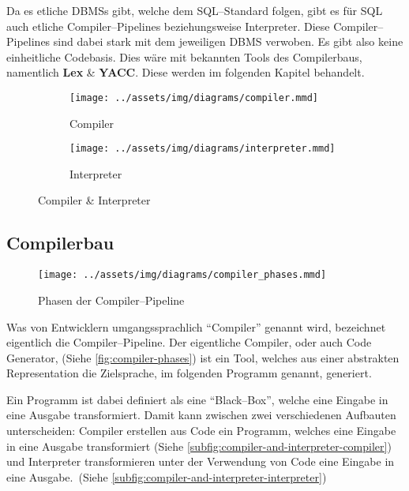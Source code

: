 Da es etliche \acp{DBMS} gibt, welche dem \ac{SQL}--Standard folgen, gibt es für \ac{SQL} auch etliche Compiler--Pipelines beziehungsweise Interpreter.
Diese Compiler--Pipelines sind dabei stark mit dem jeweiligen \ac{DBMS} verwoben.
Es gibt also keine einheitliche Codebasis.
Dies wäre mit bekannten Tools des Compilerbaus, namentlich \textbf{Lex} \& \textbf{YACC}.
Diese werden im folgenden Kapitel behandelt.

\begin{figure}[ht]
    \begin{subfigure}[c]{0.5\textwidth}
        \begin{center}
            \texttt{[image: ../assets/img/diagrams/compiler.mmd]}
        \end{center}
        \caption{Compiler}
        \label{subfig:compiler-and-interpreter-compiler}
    \end{subfigure}
    \begin{subfigure}[c]{0.5\textwidth}
        \begin{center}
            \texttt{[image: ../assets/img/diagrams/interpreter.mmd]}
        \end{center}
        \caption{Interpreter}
        \label{subfig:compiler-and-interpreter-interpreter}
    \end{subfigure}
    \caption{Compiler \& Interpreter~\autocite{aho-2006}}
    \label{fig:compiler-and-interpreter}
\end{figure}
\newpage

\subsection{Compilerbau}\label{subsec:compilerbau}
\begin{wrapfigure}{rH}{0.5\textwidth}
    \begin{center}
        \texttt{[image: ../assets/img/diagrams/compiler\_phases.mmd]}
    \end{center}
    \caption{Phasen der Compiler--Pipeline~\autocite{aho-2006}}
    \label{fig:compiler-phases}
\end{wrapfigure}
Was von Entwicklern umgangssprachlich \enquote{Compiler} genannt wird, bezeichnet eigentlich die Compiler--Pipeline.
Der eigentliche Compiler, oder auch Code Generator, (Siehe \autoref{fig:compiler-phases}) ist ein Tool, welches aus einer abstrakten Representation die Zielsprache, im folgenden Programm genannt, generiert.

Ein Programm ist dabei definiert als eine \enquote{Black--Box}, welche eine Eingabe in eine Ausgabe transformiert.
Damit kann zwischen zwei verschiedenen Aufbauten unterscheiden: Compiler erstellen aus Code ein Programm, welches eine Eingabe in eine Ausgabe transformiert (Siehe \autoref{subfig:compiler-and-interpreter-compiler}) und Interpreter transformieren unter der Verwendung von Code eine Eingabe in eine Ausgabe.~(Siehe \autoref{subfig:compiler-and-interpreter-interpreter})

